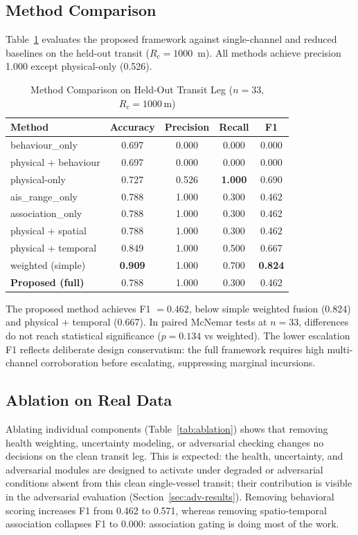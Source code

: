 \documentclass[conference]{IEEEtran}
\begin{document}
\subsection{Method Comparison}
Table~\ref{tab:methods} evaluates the proposed framework against single-channel
and reduced baselines on the held-out transit ($R_c = 1000$~m). All methods
achieve precision 1.000 except physical-only (0.526).

\begin{table}[!t]
\caption{Method Comparison on Held-Out Transit Leg ($n=33$, $R_c=1000\,\mathrm{m}$)}
\label{tab:methods}
\centering
\footnotesize
\begin{tabular}{@{}lcccc@{}}
\toprule
Method & Accuracy & Precision & Recall & F1 \\
\midrule
behaviour\_only & 0.697 & 0.000 & 0.000 & 0.000 \\
physical + behaviour & 0.697 & 0.000 & 0.000 & 0.000 \\
physical-only & 0.727 & 0.526 & \textbf{1.000} & 0.690 \\
ais\_range\_only & 0.788 & 1.000 & 0.300 & 0.462 \\
association\_only & 0.788 & 1.000 & 0.300 & 0.462 \\
physical + spatial & 0.788 & 1.000 & 0.300 & 0.462 \\
physical + temporal & 0.849 & 1.000 & 0.500 & 0.667 \\
weighted (simple) & \textbf{0.909} & 1.000 & 0.700 & \textbf{0.824} \\
\textbf{Proposed (full)} & 0.788 & 1.000 & 0.300 & 0.462 \\
\bottomrule
\end{tabular}
\end{table}

The proposed method achieves F1 $= 0.462$, below simple weighted fusion (0.824)
and physical + temporal (0.667). In paired McNemar tests at $n=33$, differences
do not reach statistical significance ($p = 0.134$ vs weighted). The lower
escalation F1 reflects deliberate design conservatism: the full framework
requires high multi-channel corroboration before escalating, suppressing
marginal incursions.

\subsection{Ablation on Real Data}
Ablating individual components (Table~\ref{tab:ablation}) shows that removing
health weighting, uncertainty modeling, or adversarial checking changes no
decisions on the clean transit leg. This is expected: the health, uncertainty,
and adversarial modules are designed to activate under degraded or adversarial
conditions absent from this clean single-vessel transit; their contribution is
visible in the adversarial evaluation (Section~\ref{sec:adv-results}).
Removing behavioral scoring increases F1 from 0.462 to 0.571, whereas removing
spatio-temporal association collapses F1 to 0.000: association gating is doing
most of the work.
\end{document}

